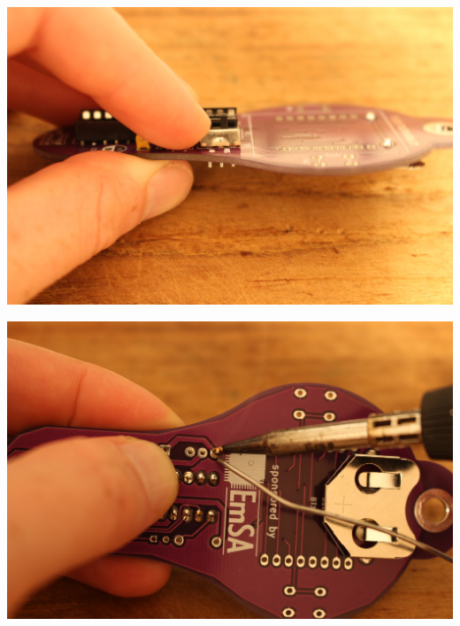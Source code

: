 \documentclass{article}
\begin{document}
\begin{minipage}[b]{0.5\textwidth}
	\includegraphics[width=\textwidth]{Bilder2024/IMG_0056.JPG}
\end{minipage}
\begin{minipage}[b]{0.5\textwidth}
	\includegraphics[width=\textwidth]{Bilder2024/IMG_0058.JPG}
\end{minipage}

\vspace{0.5cm}
\end{document}
